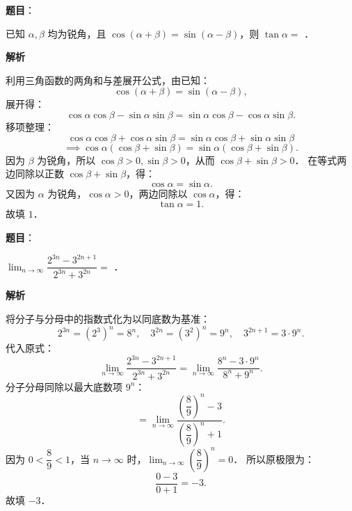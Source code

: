 \begin{answer}

\textbf{题目}：

已知 $\alpha, \beta$ 均为锐角，且 $\cos(\alpha + \beta) = \sin(\alpha - \beta)$，则 $\tan\alpha =$ \gkblank{}．

\textbf{解析}

利用三角函数的两角和与差展开公式，由已知：
\nopagebreak[4]
\[
\cos(\alpha + \beta) = \sin(\alpha - \beta),
\]
展开得：
\nopagebreak[4]
\[
\cos\alpha\cos\beta - \sin\alpha\sin\beta = \sin\alpha\cos\beta - \cos\alpha\sin\beta.
\]
移项整理：
\nopagebreak[4]
\[
\cos\alpha\cos\beta + \cos\alpha\sin\beta = \sin\alpha\cos\beta + \sin\alpha\sin\beta
\]
\nopagebreak[4]
\[
\implies \cos\alpha(\cos\beta + \sin\beta) = \sin\alpha(\cos\beta + \sin\beta).
\]
因为 $\beta$ 为锐角，所以 $\cos\beta > 0, \sin\beta > 0$，从而 $\cos\beta + \sin\beta > 0$．
在等式两边同除以正数 $\cos\beta + \sin\beta$，得：
\nopagebreak[4]
\[
\cos\alpha = \sin\alpha.
\]
又因为 $\alpha$ 为锐角，$\cos\alpha > 0$，两边同除以 $\cos\alpha$，得：
\nopagebreak[4]
\[
\tan\alpha = 1.
\]
故填 $1$．


\end{answer}
\begin{answer}

\textbf{题目}：

$\lim_{n \to \infty} \dfrac{2^{3n} - 3^{2n+1}}{2^{3n} + 3^{2n}} =$ \gkblank{}．

\textbf{解析}

将分子与分母中的指数式化为以同底数为基准：
\nopagebreak[4]
\[
2^{3n} = (2^3)^n = 8^n, \quad 3^{2n} = (3^2)^n = 9^n, \quad 3^{2n+1} = 3 \cdot 9^n.
\]
代入原式：
\nopagebreak[4]
\[
\lim_{n \to \infty} \frac{2^{3n} - 3^{2n+1}}{2^{3n} + 3^{2n}} = \lim_{n \to \infty} \frac{8^n - 3 \cdot 9^n}{8^n + 9^n}.
\]
分子分母同除以最大底数项 $9^n$：
\nopagebreak[4]
\[
= \lim_{n \to \infty} \frac{\left(\dfrac{8}{9}\right)^n - 3}{\left(\dfrac{8}{9}\right)^n + 1}.
\]
因为 $0 < \dfrac{8}{9} < 1$，当 $n \to \infty$ 时，$\lim_{n \to \infty} \left(\dfrac{8}{9}\right)^n = 0$．
所以原极限为：
\nopagebreak[4]
\[
\frac{0 - 3}{0 + 1} = -3.
\]
故填 $-3$．


\end{answer}
